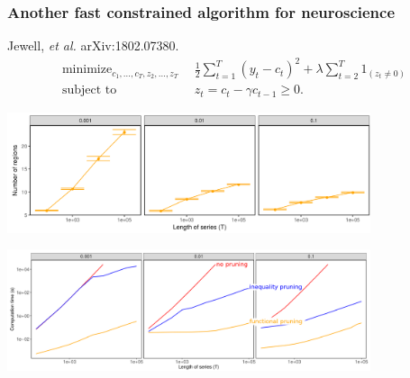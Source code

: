 \documentclass{beamer}
\DeclareMathOperator*{\minimize}{minimize}
\begin{document}
\begin{frame}
  \frametitle{Another fast constrained algorithm for neuroscience}
  Jewell, {\it et al.} arXiv:1802.07380.
\vskip -0.5cm
\begin{align*}
    \minimize_{c_1,\dots,c_T, z_2, \dots, z_T} &\ \ 
    \frac 1 2 \sum_{t=1}^T (y_t-c_t)^2  + 
\lambda\sum_{t=2}^{T} 1_{(z_t\neq 0)}
\\
      \text{subject to} &\ \ z_t = c_t - \gamma c_{t-1} \geq 0.
  \nonumber 
\end{align*}

\centering

\includegraphics[width=0.8\textwidth]{screenshot-jewell-intervals}

\includegraphics[width=0.8\textwidth]{screenshot-jewell-timings-labels}
  
\end{frame}
\end{document}
